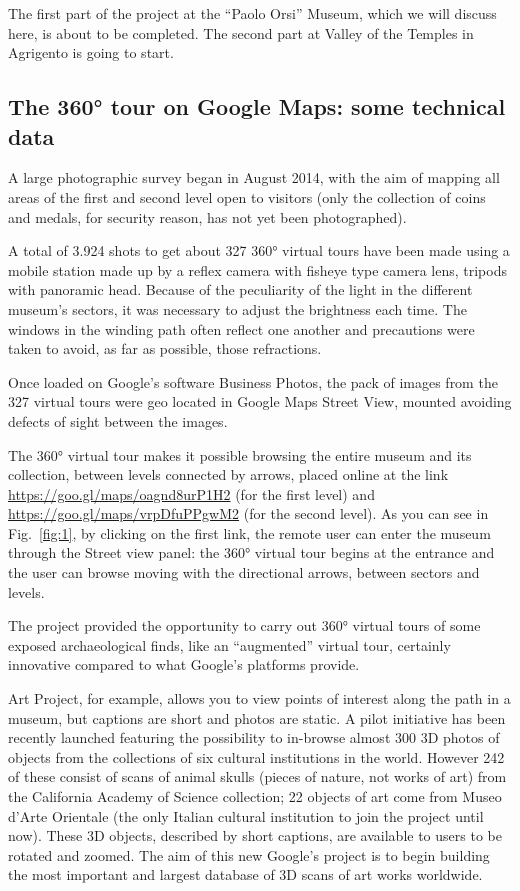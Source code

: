 \documentclass[amsthm,ebook]{saparticle}
\begin{document}
The first part of the project at the ``Paolo Orsi'' Museum, which we will discuss here, is about to be completed. The
second part at Valley of the Temples in Agrigento is going to start.




\subsection{The 360° tour on Google Maps: some technical data}


\noindent A large photographic survey began in August 2014, with the aim of mapping all areas of the first and second level open
to visitors (only the collection of coins and medals, for security reason, has not yet been photographed). 

A total of 3.924 shots to get about 327 360° virtual tours have been made using a mobile station made up by a reflex
camera with fisheye type camera lens, tripods with panoramic head. Because of the peculiarity of the light in the
different museum’s sectors, it was necessary to adjust the brightness each time. The windows in the winding path often
reflect one another and precautions were taken to avoid, as far as possible, those refractions.

Once loaded on Google’s software Business Photos, the pack of images from the 327 virtual tours were geo located in
Google Maps Street View, mounted avoiding defects of sight between the images. 

The 360° virtual tour makes it possible browsing the entire museum and its collection, between levels connected by
arrows, placed online at the link \url{https://goo.gl/maps/oagnd8urP1H2} (for the first level) and
\url{https://goo.gl/maps/vrpDfuPPgwM2} (for the second level). As you can see in Fig.~\ref{fig:1}, by clicking on the first link,
the remote user can enter the museum through the Street view panel: the 360° virtual tour begins at the entrance and
the user can browse moving with the directional arrows, between sectors and levels.

The project provided the opportunity to carry out 360° virtual tours of some exposed archaeological finds, like an
``augmented'' virtual tour, certainly innovative compared to what Google’s platforms provide. 

Art Project, for example, allows you to view points of interest along the path in a museum, but captions are short and
photos are static. A pilot initiative has been recently launched featuring the possibility to in-browse almost 300 3D
photos of objects from the collections of six cultural institutions in the world. However 242 of these consist of scans
of animal skulls (pieces of nature, not works of art) from the California Academy of Science collection; 22 objects of
art come from Museo d’Arte Orientale (the only Italian cultural institution to join the project until now). These 3D
objects, described by short captions, are available to users to be rotated and zoomed. The aim of this new Google’s
project is to begin building the most important and largest database of 3D scans of art works worldwide. 
\end{document}
